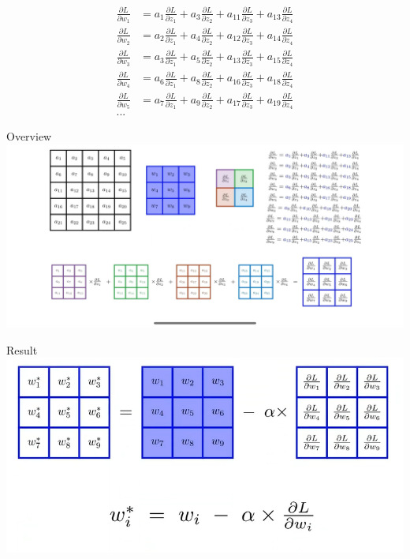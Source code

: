 \documentclass[default, aspectratio=169]{beamer}
\begin{document}
	\begin{frame}
		\begin{align*}
			\frac{\partial L}{\partial w_1} &= a_1 \frac{\partial L}{\partial z_1} + a_3 \frac{\partial L}{\partial z_2} + a_{11} \frac{\partial L}{\partial z_3} + a_{13} \frac{\partial L}{\partial z_4} \\
			\frac{\partial L}{\partial w_2} &= a_2 \frac{\partial L}{\partial z_1} + a_4 \frac{\partial L}{\partial z_2} + a_{12} \frac{\partial L}{\partial z_3} + a_{14} \frac{\partial L}{\partial z_4} \\
			\frac{\partial L}{\partial w_3} &= a_3 \frac{\partial L}{\partial z_1} + a_5 \frac{\partial L}{\partial z_2} + a_{13} \frac{\partial L}{\partial z_3} + a_{15} \frac{\partial L}{\partial z_4} \\
			\frac{\partial L}{\partial w_4} &= a_6 \frac{\partial L}{\partial z_1} + a_8 \frac{\partial L}{\partial z_2} + a_{16} \frac{\partial L}{\partial z_3} + a_{18} \frac{\partial L}{\partial z_4} \\
			\frac{\partial L}{\partial w_5} &= a_7 \frac{\partial L}{\partial z_1} + a_9 \frac{\partial L}{\partial z_2} + a_{17} \frac{\partial L}{\partial z_3} + a_{19} \frac{\partial L}{\partial z_4} \\...
		\end{align*}
		
	\end{frame}
	\begin{frame}{Overview}
		\centering
		\includegraphics[keepaspectratio, scale=0.15]{pic/BP11.png}
	\end{frame}
	\begin{frame}{Result}
		\centering
		\includegraphics[keepaspectratio, scale=0.45]{pic/BP12.png}
	\end{frame}
	
\end{document}
